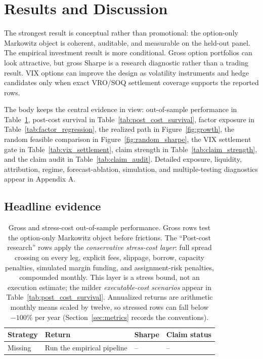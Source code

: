 
\section{Results and Discussion}\label{sec:results}

The strongest result is conceptual rather than promotional: the option-only Markowitz
object is coherent, auditable, and measurable on the held-out panel. The empirical
investment result is more conditional. Gross option portfolios can look attractive, but
gross Sharpe is a research diagnostic rather than a trading result. VIX options can improve
the design as volatility instruments and hedge candidates only when exact VRO/SOQ settlement
coverage supports the reported rows.

The body keeps the central evidence in view: out-of-sample performance in
Table~\ref{tab:performance}, post-cost survival in Table~\ref{tab:post_cost_survival},
factor exposure in Table~\ref{tab:factor_regression}, the realized path in
Figure~\ref{fig:growth}, the random feasible comparison in Figure~\ref{fig:random_sharpe},
the VIX settlement gate in Table~\ref{tab:vix_settlement}, claim strength in
Table~\ref{tab:claim_strength}, and the claim audit in Table~\ref{tab:claim_audit}.
Detailed exposure, liquidity, attribution, regime, forecast-ablation, simulation, and
multiple-testing diagnostics appear in Appendix A.

\subsection{Headline evidence}

\begin{table}[H]
\centering
\scriptsize
{}
  {\resizebox{\textwidth}{!}{}}
  {\begin{tabular}{llll}\toprule Strategy & Return & Sharpe & Claim status \\\midrule
  Missing & Run the empirical pipeline & -- & -- \\\bottomrule\end{tabular}}
\caption{Gross and stress-cost out-of-sample performance. Gross rows test the option-only
Markowitz object before frictions. The ``Post-cost research'' rows apply the
\emph{conservative stress-cost layer}: full spread crossing on every leg, explicit fees,
slippage, borrow, capacity penalties, simulated margin funding, and assignment-risk
penalties, compounded monthly. This layer is a stress bound, not an execution estimate;
the milder \emph{executable-cost scenarios} appear in
Table~\ref{tab:post_cost_survival}. Annualized returns are arithmetic monthly means
scaled by twelve, so stressed rows can fall below \(-100\%\) per year
(Section~\ref{sec:metrics} records the conventions).}
\label{tab:performance}
\end{table}

